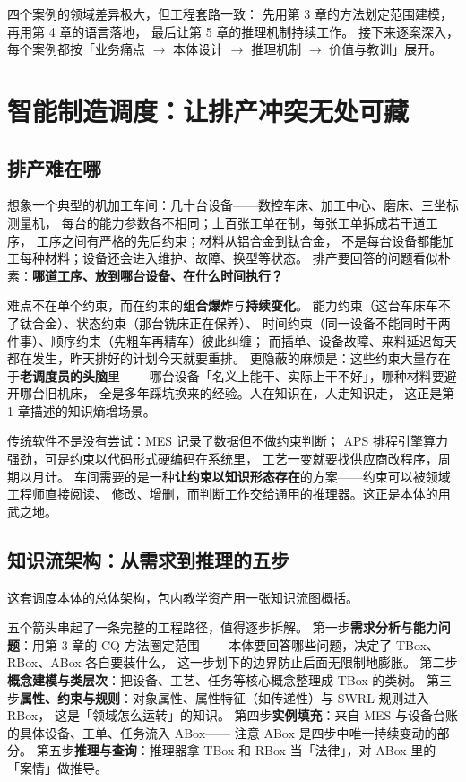 四个案例的领域差异极大，但工程套路一致：
先用第 3 章的方法划定范围建模，再用第 4 章的语言落地，
最后让第 5 章的推理机制持续工作。
接下来逐案深入，每个案例都按「业务痛点 \(\rightarrow\) 本体设计 \(\rightarrow\) 推理机制 \(\rightarrow\) 价值与教训」展开。

\section{智能制造调度：让排产冲突无处可藏}

\subsection{排产难在哪}

想象一个典型的机加工车间：几十台设备——数控车床、加工中心、磨床、三坐标测量机，
每台的能力参数各不相同；上百张工单在制，每张工单拆成若干道工序，
工序之间有严格的先后约束；材料从铝合金到钛合金，
不是每台设备都能加工每种材料；设备还会进入维护、故障、换型等状态。
排产要回答的问题看似朴素：\textbf{哪道工序、放到哪台设备、在什么时间执行？}

难点不在单个约束，而在约束的\textbf{组合爆炸}与\textbf{持续变化}。
能力约束（这台车床车不了钛合金）、状态约束（那台铣床正在保养）、
时间约束（同一设备不能同时干两件事）、顺序约束（先粗车再精车）彼此纠缠；
而插单、设备故障、来料延迟每天都在发生，昨天排好的计划今天就要重排。
更隐蔽的麻烦是：这些约束大量存在于\textbf{老调度员的头脑}里——
哪台设备「名义上能干、实际上干不好」，哪种材料要避开哪台旧机床，
全是多年踩坑换来的经验。人在知识在，人走知识走，
这正是第 1 章描述的知识熵增场景。

传统软件不是没有尝试：MES 记录了数据但不做约束判断；
APS 排程引擎算力强劲，可是约束以代码形式硬编码在系统里，
工艺一变就要找供应商改程序，周期以月计。
车间需要的是一种\textbf{让约束以知识形态存在}的方案——约束可以被领域工程师直接阅读、
修改、增删，而判断工作交给通用的推理器。这正是本体的用武之地。

\subsection{知识流架构：从需求到推理的五步}

这套调度本体的总体架构，包内教学资产用一张知识流图概括。



五个箭头串起了一条完整的工程路径，值得逐步拆解。
第一步\textbf{需求分析与能力问题}：用第 3 章的 CQ 方法圈定范围——
本体要回答哪些问题，决定了 TBox、RBox、ABox 各自要装什么，
这一步划下的边界防止后面无限制地膨胀。
第二步\textbf{概念建模与类层次}：把设备、工艺、任务等核心概念整理成 TBox 的类树。
第三步\textbf{属性、约束与规则}：对象属性、属性特征（如传递性）与 SWRL 规则进入 RBox，
这是「领域怎么运转」的知识。
第四步\textbf{实例填充}：来自 MES 与设备台账的具体设备、工单、任务流入 ABox——
注意 ABox 是四步中唯一持续变动的部分。
第五步\textbf{推理与查询}：推理器拿 TBox 和 RBox 当「法律」，对 ABox 里的「案情」做推导。

